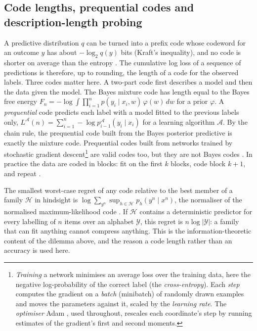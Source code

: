 \documentclass[11pt,a4paper]{article}
\begin{document}
\subsection{Code lengths, prequential codes and description-length probing}
\label{sec:bg:mdl}

A predictive distribution $q$ can be turned into a prefix code whose codeword for an outcome $y$ has about $-\log_2 q(y)$ bits (Kraft's inequality), and no code is shorter on average than the entropy \cite{grunwald2007}. The cumulative log loss of a sequence of predictions is therefore, up to rounding, the length of a code for the observed labels. Three codes matter here. A two-part code first describes a model and then the data given the model. The Bayes mixture code has length equal to the Bayes free energy $F_n=-\log\int\prod_{i=1}^n p(y_i\mid x_i,w)\,\varphi(w)\,dw$ for a prior $\varphi$. A \emph{prequential} code \cite{dawid1984} predicts each label with a model fitted to the previous labels only, $L^{\mathcal A}(n)=\sum_{i=1}^n-\log p^{\mathcal A}_{i-1}(y_i\mid x_i)$ for a learning algorithm $\mathcal A$. By the chain rule, the prequential code built from the Bayes posterior predictive is exactly the mixture code. Prequential codes built from networks trained by stochastic gradient descent\footnote{\emph{Training} a network minimises an average loss over the training data, here the negative log-probability of the correct label (the \emph{cross-entropy}). Each \emph{step} computes the gradient on a \emph{batch} (minibatch) of randomly drawn examples and moves the parameters against it, scaled by the \emph{learning rate}. The \emph{optimiser} Adam \cite{kingma2015adam}, used throughout, rescales each coordinate's step by running estimates of the gradient's first and second moments.} are valid codes too, but they are not Bayes codes \cite{blierollivier2018}. In practice the data are coded in blocks: fit on the first $k$ blocks, code block $k+1$, and repeat \cite{voita2020,blierollivier2018}.

The smallest worst-case regret of any code relative to the best member of a family $\mathcal H$ in hindsight is $\log\sum_{y^n}\sup_{h\in\mathcal H}p_h(y^n\mid x^n)$, the normaliser of the normalised maximum-likelihood code \cite{shtarkov1987,grunwald2007}. If $\mathcal H$ contains a deterministic predictor for every labelling of $n$ items over an alphabet $\mathcal Y$, this regret is $n\log|\mathcal Y|$: a family that can fit anything cannot compress anything. This is the information-theoretic content of the dilemma above, and the reason a code length rather than an accuracy is used here.
\end{document}
